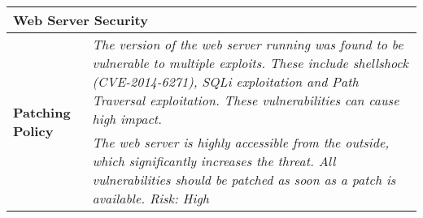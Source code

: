 \begin{table}
\begin{tabular}{|l|p{10.5cm}|} 
\hline
\multicolumn{2}{|l|}{Web Server Security}                              \\ \hline

\multirow{2}{*}{\textbf{Patching Policy}} & \textit{The version of the web server running was found to be vulnerable to multiple exploits. These include shellshock (CVE-2014-6271), SQLi exploitation and Path Traversal exploitation. These vulnerabilities can cause high impact.}    \\ \cline{2-2} 
                                               & \textit{The web server is highly accessible from the outside, which significantly increases the threat. All vulnerabilities should be patched as soon as a patch is available. Risk: High} \\ \hline

\end{tabular}
\end{table}